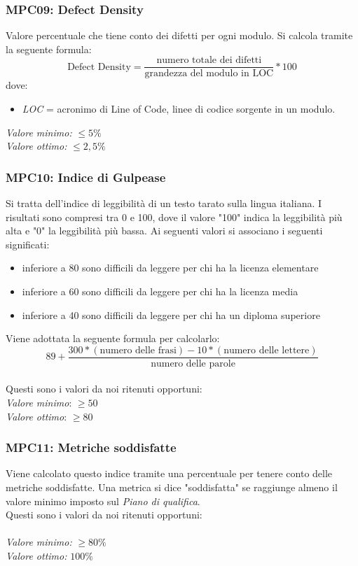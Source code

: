 \subsubsection{MPC09: Defect Density}
Valore percentuale che tiene conto dei difetti per ogni modulo.
Si calcola tramite la seguente formula:\\
\begin{equation*}
\text{Defect Density}=\frac{\text{numero totale dei difetti}}{\text{grandezza del modulo in LOC}}*100
\end{equation*}
dove:
\begin{itemize}
\item \textit{LOC} = acronimo di Line of Code, linee di codice sorgente in un modulo.
\end{itemize}
\textit{Valore minimo:} $\le 5\%$\\
\textit{Valore ottimo:} $\le 2,5\%$

\subsubsection{MPC10: Indice di Gulpease}
Si tratta dell'indice di leggibilità di un testo tarato sulla lingua italiana.
I risultati sono compresi tra 0 e 100, dove il valore "100" indica la leggibilità più alta e "0" la leggibilità più bassa. Ai seguenti valori si associano i seguenti significati:
\begin{itemize}
\item inferiore a 80 sono difficili da leggere per chi ha la licenza elementare
\item inferiore a 60 sono difficili da leggere per chi ha la licenza media
\item inferiore a 40 sono difficili da leggere per chi ha un diploma superiore
\end{itemize}
Viene adottata la seguente formula per calcolarlo:
\begin{equation*}
89+\frac{300*(\text{numero delle frasi})-10*(\text{numero delle lettere})}{\text{numero delle parole}}
\end{equation*}\\
Questi sono i valori da noi ritenuti opportuni:\\
\textit{Valore minimo}: $ \ge 50 $\\ 
\textit{Valore ottimo}: $ \ge 80 $\\

\subsubsection{MPC11: Metriche soddisfatte}
Viene calcolato questo indice tramite una percentuale per tenere conto delle metriche soddisfatte. Una metrica si dice "soddisfatta" se raggiunge almeno il valore minimo imposto sul \textit{Piano di qualifica}.\\
Questi sono i valori da noi ritenuti opportuni:\\\\
\textit{Valore minimo:} $ \ge 80\% $\\
\textit{Valore ottimo:} $ 100\% $\\

